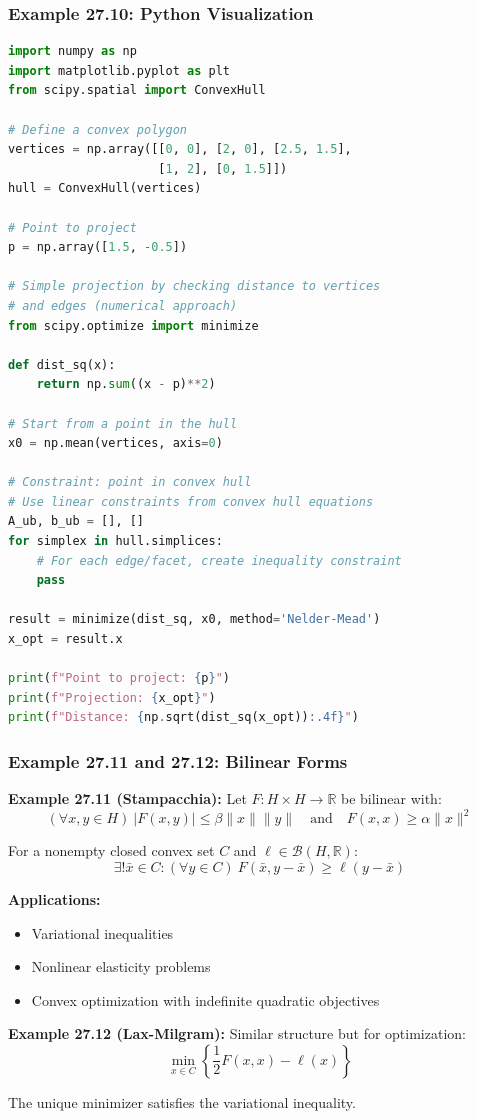 \documentclass[aspectratio=169,10pt]{beamer}
\begin{document}
\begin{frame}[fragile]
\frametitle{Example 27.10: Python Visualization}

\begin{lstlisting}[language=Python]
import numpy as np
import matplotlib.pyplot as plt
from scipy.spatial import ConvexHull

# Define a convex polygon
vertices = np.array([[0, 0], [2, 0], [2.5, 1.5],
                     [1, 2], [0, 1.5]])
hull = ConvexHull(vertices)

# Point to project
p = np.array([1.5, -0.5])

# Simple projection by checking distance to vertices
# and edges (numerical approach)
from scipy.optimize import minimize

def dist_sq(x):
    return np.sum((x - p)**2)

# Start from a point in the hull
x0 = np.mean(vertices, axis=0)

# Constraint: point in convex hull
# Use linear constraints from convex hull equations
A_ub, b_ub = [], []
for simplex in hull.simplices:
    # For each edge/facet, create inequality constraint
    pass

result = minimize(dist_sq, x0, method='Nelder-Mead')
x_opt = result.x

print(f"Point to project: {p}")
print(f"Projection: {x_opt}")
print(f"Distance: {np.sqrt(dist_sq(x_opt)):.4f}")
\end{lstlisting}

\end{frame}

\begin{frame}[allowframebreaks]
\frametitle{Example 27.11 and 27.12: Bilinear Forms}

\textbf{Example 27.11 (Stampacchia):} Let $F : H \times H \to \mathbb{R}$ be bilinear with:
\[(\forall x, y \in H)\ |F(x, y)| \leq \beta\|x\|\|y\| \quad \text{and} \quad F(x, x) \geq \alpha\|x\|^2\]

For a nonempty closed convex set $C$ and $\ell \in \mathcal{B}(H, \mathbb{R})$:
\[\exists! \bar{x} \in C : (\forall y \in C)\ F(\bar{x}, y - \bar{x}) \geq \ell(y - \bar{x})\]

\textbf{Applications:}
\begin{itemize}
    \item Variational inequalities
    \item Nonlinear elasticity problems
    \item Convex optimization with indefinite quadratic objectives
\end{itemize}

\vspace{0.3cm}

\textbf{Example 27.12 (Lax-Milgram):} Similar structure but for optimization:
\[\min_{x \in C} \left\{\frac{1}{2}F(x, x) - \ell(x)\right\}\]

The unique minimizer satisfies the variational inequality.

\end{frame}
\end{document}
